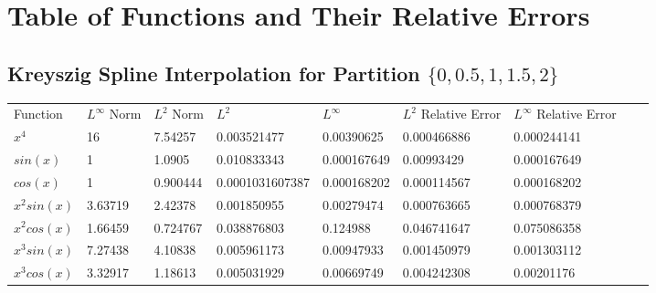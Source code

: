 
%
\chapter*{\thechapter \quad Table of Functions and Their Relative Errors}
\label{appendixF}

\section{Kreyszig Spline Interpolation for \newline
Partition $\{0,0.5,1,1.5,2\}$}
\tiny{\begin{tabular}{lllllllll}
Function                                     &  $L^{\infty}$ Norm & $L^2$ Norm  & $L^2$           & $L^{\infty}$       & $L^2$ Relative Error & $L^{\infty}$ Relative Error \\
$x^4$                     & 16                      & 7.54257                & 0.003521477                     & 0.00390625                      & 0.000466886                         & 0.000244141                           \\
$sin(x)$                                      & 1                       & 1.0905                & 0.010833343                     & 0.000167649                     & 0.00993429                          & 0.000167649                           \\
$cos(x)$                                      & 1                       & 0.900444              & 0.0001031607387 & 0.000168202 & 0.000114567                         & 0.000168202                           \\
$x^2sin(x)$               & 3.63719                 & 2.42378               & 0.001850955                     & 0.00279474                      & 0.000763665                         & 0.000768379                           \\
$x^2cos(x)$               & 1.66459                 & 0.724767              & 0.038876803                     & 0.124988                        & 0.046741647                         & 0.075086358                           \\
$x^3sin(x)$               & 7.27438                 & 4.10838               & 0.005961173                     & 0.00947933                      & 0.001450979                         & 0.001303112                           \\
$x^3cos(x)$               & 3.32917                 & 1.18613               & 0.005031929                     & 0.00669749                      & 0.004242308                         & 0.00201176                            \\

\end{tabular}}
